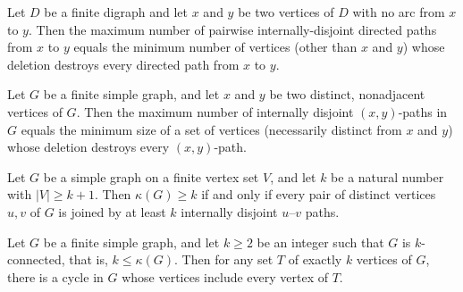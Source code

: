 \begin{theorem}
\label{Networks.menger_vertex_digraph}
Let $D$ be a finite digraph and let $x$ and $y$ be two vertices of $D$ with no arc from
$x$ to $y$. Then the maximum number of pairwise internally-disjoint directed paths from
$x$ to $y$ equals the minimum number of vertices (other than $x$ and $y$) whose deletion
destroys every directed path from $x$ to $y$.
\end{theorem}

\begin{theorem}
\label{Networks.menger_vertex_graph}
Let $G$ be a finite simple graph, and let $x$ and $y$ be two distinct, nonadjacent
vertices of $G$. Then the maximum number of internally disjoint $(x,y)$-paths in $G$
equals the minimum size of a set of vertices (necessarily distinct from $x$ and $y$)
whose deletion destroys every $(x,y)$-path.
\end{theorem}

\begin{theorem}
\label{Networks.k_connected_iff_internally_disjoint_paths}
Let $G$ be a simple graph on a finite vertex set $V$, and let $k$ be a natural number
with $|V| \ge k+1$. Then $\kappa(G) \ge k$ if and only if every pair of distinct
vertices $u, v$ of $G$ is joined by at least $k$ internally disjoint $u$–$v$ paths.
\end{theorem}

\begin{theorem}
\label{Networks.dirac_k_vertices_on_cycle}
Let $G$ be a finite simple graph, and let $k \ge 2$ be an integer such that $G$ is
$k$-connected, that is, $k \le \kappa(G)$. Then for any set $T$ of exactly $k$ vertices
of $G$, there is a cycle in $G$ whose vertices include every vertex of $T$.
\end{theorem}

